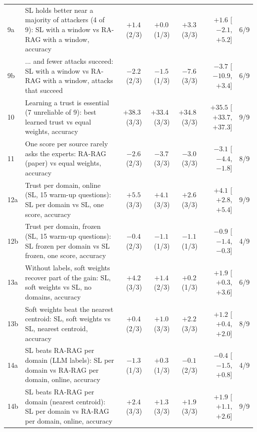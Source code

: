 \begin{landscape}
\begin{table}
\begin{tabular}{@{}l p{12.4cm} rrr r c@{}}
9a & SL holds better near a majority of attackers (4 of 9): SL with a window vs RA-RAG with a window, accuracy & $+1.4$\,{\scriptsize(2/3)} & $+0.0$\,{\scriptsize(1/3)} & $+3.3$\,{\scriptsize(3/3)} & $+1.6$ [$-2.1$, $+5.2$] & 6/9 \\
9b & ... and fewer attacks succeed: SL with a window vs RA-RAG with a window, attacks that succeed & $-2.2$\,{\scriptsize(2/3)} & $-1.5$\,{\scriptsize(1/3)} & $-7.6$\,{\scriptsize(3/3)} & $-3.7$ [$-10.9$, $+3.4$] & 6/9 \\
10 & Learning a trust is essential (7 unreliable of 9): best learned trust vs equal weights, accuracy & $+38.3$\,{\scriptsize(3/3)} & $+33.4$\,{\scriptsize(3/3)} & $+34.8$\,{\scriptsize(3/3)} & $+35.5$ [$+33.7$, $+37.3$] & 9/9 \\
11 & One score per source rarely asks the experts: RA-RAG (paper) vs equal weights, accuracy & $-2.6$\,{\scriptsize(2/3)} & $-3.7$\,{\scriptsize(3/3)} & $-3.0$\,{\scriptsize(3/3)} & $-3.1$ [$-4.4$, $-1.8$] & 8/9 \\
12a & Trust per domain, online (SL, 15 warm-up questions): SL per domain vs SL, one score, accuracy & $+5.5$\,{\scriptsize(3/3)} & $+4.1$\,{\scriptsize(3/3)} & $+2.6$\,{\scriptsize(3/3)} & $+4.1$ [$+2.8$, $+5.4$] & 9/9 \\
12b & Trust per domain, frozen (SL, 15 warm-up questions): SL frozen per domain vs SL frozen, one score, accuracy & $-0.4$\,{\scriptsize(2/3)} & $-1.1$\,{\scriptsize(1/3)} & $-1.1$\,{\scriptsize(1/3)} & $-0.9$ [$-1.4$, $-0.3$] & 4/9 \\
13a & Without labels, soft weights recover part of the gain: SL, soft weights vs SL, no domains, accuracy & $+4.2$\,{\scriptsize(3/3)} & $+1.4$\,{\scriptsize(2/3)} & $+0.2$\,{\scriptsize(1/3)} & $+1.9$ [$+0.3$, $+3.6$] & 6/9 \\
13b & Soft weights beat the nearest centroid: SL, soft weights vs SL, nearest centroid, accuracy & $+0.4$\,{\scriptsize(2/3)} & $+1.0$\,{\scriptsize(3/3)} & $+2.2$\,{\scriptsize(3/3)} & $+1.2$ [$+0.4$, $+2.0$] & 8/9 \\
14a & SL beats RA-RAG per domain (LLM labels): SL per domain vs RA-RAG per domain, online, accuracy & $-1.3$\,{\scriptsize(1/3)} & $+0.3$\,{\scriptsize(1/3)} & $-0.1$\,{\scriptsize(2/3)} & $-0.4$ [$-1.5$, $+0.8$] & 4/9 \\
14b & SL beats RA-RAG per domain (nearest centroid): SL per domain vs RA-RAG per domain, online, accuracy & $+2.4$\,{\scriptsize(3/3)} & $+1.3$\,{\scriptsize(3/3)} & $+1.9$\,{\scriptsize(3/3)} & $+1.9$ [$+1.1$, $+2.6$] & 9/9 \\

\end{tabular}
\end{table}
\end{landscape}
